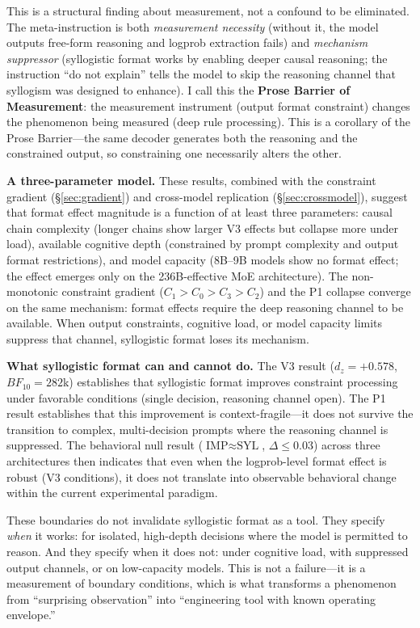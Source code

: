 \documentclass[11pt]{article}
\begin{document}
This is a structural finding about measurement, not a confound to be eliminated.
The meta-instruction is both \textit{measurement necessity} (without it, the
model outputs free-form reasoning and logprob extraction fails) and
\textit{mechanism suppressor} (syllogistic format works by enabling deeper causal
reasoning; the instruction ``do not explain'' tells the model to skip the
reasoning channel that syllogism was designed to enhance). I call this the
\textbf{Prose Barrier of Measurement}: the measurement instrument (output format
constraint) changes the phenomenon being measured (deep rule processing). This is
a corollary of the Prose Barrier---the same decoder generates both the reasoning
and the constrained output, so constraining one necessarily alters the other.

\textbf{A three-parameter model.} These results, combined with the constraint
gradient (\S\ref{sec:gradient}) and cross-model replication
(\S\ref{sec:crossmodel}), suggest that format effect magnitude is a function of
at least three parameters: causal chain complexity (longer chains show larger V3
effects but collapse more under load), available cognitive depth (constrained by
prompt complexity and output format restrictions), and model capacity (8B--9B
models show no format effect; the effect emerges only on the 236B-effective MoE
architecture). The non-monotonic constraint gradient ($C_1 > C_0 > C_3 > C_2$)
and the P1 collapse converge on the same mechanism: format effects require the
deep reasoning channel to be available. When output constraints, cognitive load,
or model capacity limits suppress that channel, syllogistic format loses its
mechanism.

\textbf{What syllogistic format can and cannot do.} The V3 result ($d_z=+0.578$,
$BF_{10}=282$k) establishes that syllogistic format improves constraint
processing under favorable conditions (single decision, reasoning channel open).
The P1 result establishes that this improvement is context-fragile---it does not
survive the transition to complex, multi-decision prompts where the reasoning
channel is suppressed. The behavioral null result ($\text{IMP}\approx\text{SYL}$,
$\Delta\leq 0.03$) across three architectures then indicates that even when the
logprob-level format effect is robust (V3 conditions), it does not translate into
observable behavioral change within the current experimental paradigm.

These boundaries do not invalidate syllogistic format as a tool. They specify
\textit{when} it works: for isolated, high-depth decisions where the model is
permitted to reason. And they specify when it does not: under cognitive load,
with suppressed output channels, or on low-capacity models. This is not a
failure---it is a measurement of boundary conditions, which is what transforms a
phenomenon from ``surprising observation'' into ``engineering tool with known
operating envelope.''
\end{document}
